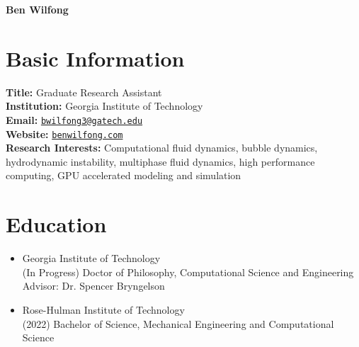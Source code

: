 \documentclass{article}
\begin{document}
\begin{center}
    \LARGE{\textbf{Ben Wilfong}}
\end{center}

\section{Basic Information}
\textbf{Title:} Graduate Research Assistant \\
\textbf{Institution:} Georgia Institute of Technology \\
\textbf{Email:} \href{mailto:bwilfong3@gatech.edu}{\texttt{bwilfong3@gatech.edu}} \\
\textbf{Website:} \href{https://benwilfong.com}{\texttt{benwilfong.com}} \\
\textbf{Research Interests:} Computational fluid dynamics, bubble dynamics, hydrodynamic instability, multiphase fluid dynamics, high performance computing, GPU accelerated modeling and simulation

\section{Education}
\begin{itemize}
    \item Georgia Institute of Technology \\
    \hspace*{0.25cm} (In Progress) Doctor of Philosophy, Computational Science and Engineering \\
    \hspace*{2.4cm} Advisor: Dr. Spencer Bryngelson
    \item Rose-Hulman Institute of Technology \\
    \hspace*{0.25cm} (2022) Bachelor of Science, Mechanical Engineering and Computational Science
\end{itemize}
\end{document}
